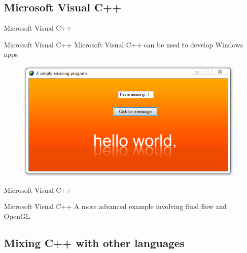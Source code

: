 \documentclass[compress]{beamer}
\begin{document}
\subsection{Microsoft Visual C++}
\begin{frame}{Microsoft Visual C++}
	
\begin{exampleblock}{Microsoft Visual C++}
Microsoft Visual C++ can be used to develop Windows apps
\end{exampleblock}
	
	\begin{figure}
		\centering
		\includegraphics[width=0.8\linewidth]{figures/visual_c++_program.png}
	\end{figure}	

\end{frame}

\begin{frame}{Microsoft Visual C++}
\begin{exampleblock}{Microsoft Visual C++}
A more advanced example involving fluid flow and OpenGL
\end{exampleblock}
		\begin{figure}[h!]
		\end{figure}
\end{frame}


\subsection{Mixing C++ with other languages}
\end{document}
